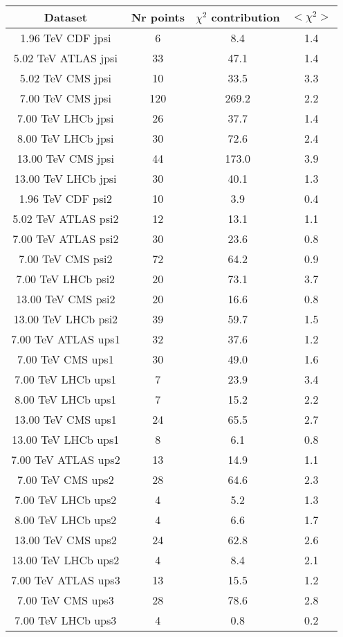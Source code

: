 \begin{table}[h!]
\centering
\begin{tabular}{c|c|c|c}
Dataset & Nr points & $\chi^2$ contribution & $<\chi^2>$ \\
\hline
1.96 TeV CDF jpsi & 6 & 8.4 & 1.4 \\
5.02 TeV ATLAS jpsi & 33 & 47.1 & 1.4 \\
5.02 TeV CMS jpsi & 10 & 33.5 & 3.3 \\
7.00 TeV CMS jpsi & 120 & 269.2 & 2.2 \\
7.00 TeV LHCb jpsi & 26 & 37.7 & 1.4 \\
8.00 TeV LHCb jpsi & 30 & 72.6 & 2.4 \\
13.00 TeV CMS jpsi & 44 & 173.0 & 3.9 \\
13.00 TeV LHCb jpsi & 30 & 40.1 & 1.3 \\
1.96 TeV CDF psi2 & 10 & 3.9 & 0.4 \\
5.02 TeV ATLAS psi2 & 12 & 13.1 & 1.1 \\
7.00 TeV ATLAS psi2 & 30 & 23.6 & 0.8 \\
7.00 TeV CMS psi2 & 72 & 64.2 & 0.9 \\
7.00 TeV LHCb psi2 & 20 & 73.1 & 3.7 \\
13.00 TeV CMS psi2 & 20 & 16.6 & 0.8 \\
13.00 TeV LHCb psi2 & 39 & 59.7 & 1.5 \\
7.00 TeV ATLAS ups1 & 32 & 37.6 & 1.2 \\
7.00 TeV CMS ups1 & 30 & 49.0 & 1.6 \\
7.00 TeV LHCb ups1 & 7 & 23.9 & 3.4 \\
8.00 TeV LHCb ups1 & 7 & 15.2 & 2.2 \\
13.00 TeV CMS ups1 & 24 & 65.5 & 2.7 \\
13.00 TeV LHCb ups1 & 8 & 6.1 & 0.8 \\
7.00 TeV ATLAS ups2 & 13 & 14.9 & 1.1 \\
7.00 TeV CMS ups2 & 28 & 64.6 & 2.3 \\
7.00 TeV LHCb ups2 & 4 & 5.2 & 1.3 \\
8.00 TeV LHCb ups2 & 4 & 6.6 & 1.7 \\
13.00 TeV CMS ups2 & 24 & 62.8 & 2.6 \\
13.00 TeV LHCb ups2 & 4 & 8.4 & 2.1 \\
7.00 TeV ATLAS ups3 & 13 & 15.5 & 1.2 \\
7.00 TeV CMS ups3 & 28 & 78.6 & 2.8 \\
7.00 TeV LHCb ups3 & 4 & 0.8 & 0.2 \\

\end{tabular}
\end{table}
